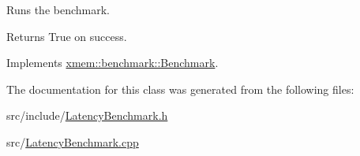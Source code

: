 Runs the benchmark. 

\begin{DoxyReturn}{Returns}
True on success. 
\end{DoxyReturn}


Implements \hyperlink{classxmem_1_1benchmark_1_1_benchmark_aa0dbe60e525457770c835c6c72a0be6a}{xmem\-::benchmark\-::\-Benchmark}.



The documentation for this class was generated from the following files\-:\begin{DoxyCompactItemize}
\item 
src/include/\hyperlink{_latency_benchmark_8h}{Latency\-Benchmark.\-h}\item 
src/\hyperlink{_latency_benchmark_8cpp}{Latency\-Benchmark.\-cpp}\end{DoxyCompactItemize}
